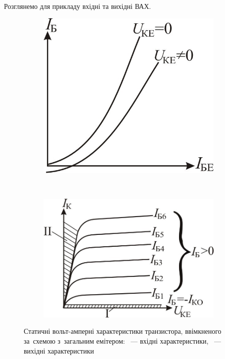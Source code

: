 \documentclass[14pt,ukrainian,utf8,simple]{eskdtext}
\begin{document}
		Розглянемо для прикладу вхідні та вихідні ВАХ.
		
		\begin{figure}[!htbp]
		\centering
			\begin{subfigure}[t]{0.5\textwidth - 0.5em}
			\centering
				\includegraphics[height = 6\baselineskip]{assets/vac-input.jpg}
			\caption{}
			\label{subfig:vac-input}
			\end{subfigure}
			~
			\begin{subfigure}[t]{0.5\textwidth - 0.5em}
			\centering
				\includegraphics[height = 6\baselineskip]{assets/vac-output.jpg}
			\caption{}
			\label{subfig:vac-output}
			\end{subfigure}
		\caption{Статичні вольт-амперні характеристики транзистора, ввімкненого за~схемою з~загальним емітером: ~— вхідні характеристики, ~— вихідні характеристики}
		\label{fig:generic-vac}
		\end{figure}
		
\end{document}
